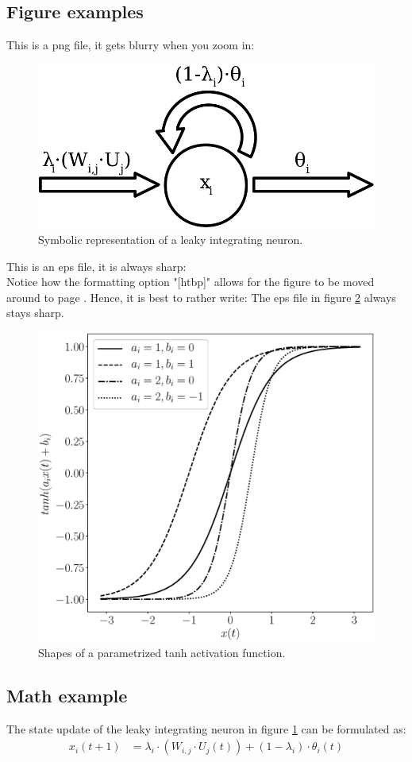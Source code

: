 \subsection{Figure examples}
This is a png file, it gets blurry when you zoom in:
\begin{figure}[htbp]
    \centering
    \includegraphics[width=.7\textwidth]{figures/leaky_integration.png}
    \caption{Symbolic representation of a leaky integrating neuron.}
    \label{fig:leaky_integration}
\end{figure}

This is an eps file, it is always sharp:\\
Notice how the formatting option "[htbp]" allows for the figure to be moved around to page \pageref{fig:activation_function}. Hence, it is best to rather write: The eps file in figure \ref{fig:activation_function} always stays sharp.
\begin{figure}[htbp]
    \centering
    \includegraphics[width=.7\textwidth]{figures/activation_functions}
    \caption{Shapes of a parametrized tanh activation function.}
    \label{fig:activation_function}
\end{figure}

\subsection{Math example}
The state update of the leaky integrating neuron in figure \ref{fig:leaky_integration} can be formulated as:
\begin{align}
    x_i(t+1) &= \lambda_i \cdot \left(W_{i,j} \cdot U_j(t)\right) + (1-\lambda_i) \cdot \theta_i(t)
    \label{eq:leaky_integration}
\end{align}

